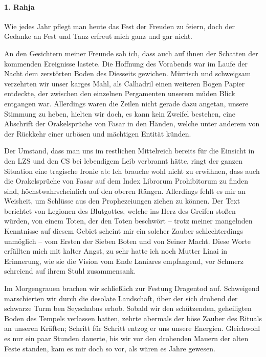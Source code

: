 \documentclass[11pt]{scrreprt}
\begin{document}
\paragraph{1. Rahja} Wie jedes Jahr pflegt man heute das Fest der Freuden zu feiern, doch der Gedanke an Fest und Tanz erfreut mich ganz und gar nicht.\par

An den Gesichtern meiner Freunde sah ich, dass auch auf ihnen der Schatten der kommenden Ereignisse lastete. Die Hoffnung des Vorabends war im Laufe der Nacht dem zerstörten Boden des Diesseits gewichen. Mürrisch und schweigsam verzehrten wir unser karges Mahl, als Calhadril einen weiteren Bogen Papier entdeckte, der zwischen den einzelnen Pergamenten unserem müden Blick entgangen war. Allerdings waren die Zeilen nicht gerade dazu angetan, unsere Stimmung zu heben, hielten wir doch, es kann kein Zweifel bestehen, eine Abschrift der Orakelsprüche von Fasar in den Händen, welche unter anderem von der Rückkehr einer urbösen und mächtigen Entität künden.\par

Der Umstand, dass man uns im restlichen Mittelreich bereits für die Einsicht in den LZS und den CS bei lebendigem Leib verbrannt hätte, ringt der ganzen Situation eine tragische Ironie ab: Ich brauche wohl nicht zu erwähnen, dass auch die Orakelsprüche von Fasar auf dem Index Librorum Prohibitorum zu finden sind, höchstwahrscheinlich auf den oberen Rängen. Allerdings fehlt es mir an Weisheit, um Schlüsse aus den Prophezeiungen ziehen zu können. Der Text berichtet von Legionen des Blutgottes, welche ins Herz des Greifen stoßen würden, von einem Toten, der den Toten beschwört – trotz meiner mangelnden Kenntnisse auf diesem Gebiet scheint mir ein solcher Zauber schlechterdings unmöglich – vom Ersten der Sieben Boten und von Seiner Macht. Diese Worte erfüllten mich mit kalter Angst, zu sehr hatte ich noch Mutter Linai in Erinnerung, wie sie die Vision vom Ende Laniares empfangend, vor Schmerz schreiend auf ihrem Stuhl zusammensank.\par

Im Morgengrauen brachen wir schließlich zur Festung Dragentod auf. Schweigend marschierten wir durch die desolate Landschaft, über der sich drohend der schwarze Turm ben Seyschabns erhob. Sobald wir den schützenden, geheiligten Boden des Tempels verlassen hatten, zehrte abermals der böse Zauber des Rituals an unseren Kräften; Schritt für Schritt entzog er uns unsere Energien. Gleichwohl es nur ein paar Stunden dauerte, bis wir vor den drohenden Mauern der alten Feste standen, kam es mir doch so vor, als wären es Jahre gewesen. \par
\end{document}
